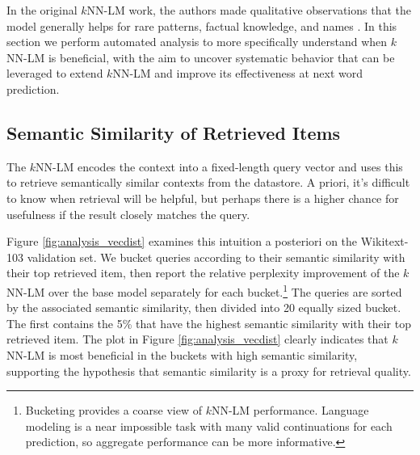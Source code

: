 \documentclass[11pt]{article}
\begin{document}
\label{sec:initial_analysis}

In the original $k$NN-LM work, the authors made qualitative observations that the model generally helps for rare patterns, factual knowledge, and names \cite{khandelwal20generalization}. In this section we perform automated analysis to more specifically understand when $k$NN-LM is beneficial, with the aim to uncover systematic behavior that can be leveraged to extend $k$NN-LM and improve its effectiveness at next word prediction.


\subsection{Semantic Similarity of Retrieved Items}

\label{sec:analysis_vecdist}

The $k$NN-LM encodes the context into a fixed-length query vector and uses this to retrieve semantically similar contexts from the datastore. A priori, it's difficult to know when retrieval will be helpful, but perhaps there is a higher chance for usefulness if the result closely matches the query.



Figure \ref{fig:analysis_vecdist} examines this intuition a posteriori on the Wikitext-103 validation set. We bucket queries according to their semantic similarity with their top retrieved item, then report the relative perplexity improvement of the $k$NN-LM over the base model separately for each bucket.\footnote{Bucketing provides a coarse view of $k$NN-LM performance. Language modeling is a near impossible task with many valid continuations for each prediction, so aggregate performance can be more informative.} The queries are sorted by the associated semantic similarity, then divided into 20 equally sized bucket. The first contains the 5\% that have the highest semantic similarity with their top retrieved item. The plot in Figure \ref{fig:analysis_vecdist} clearly indicates that $k$NN-LM is most beneficial in the buckets with high semantic similarity, supporting the hypothesis that semantic similarity is a proxy for retrieval quality.
\end{document}
